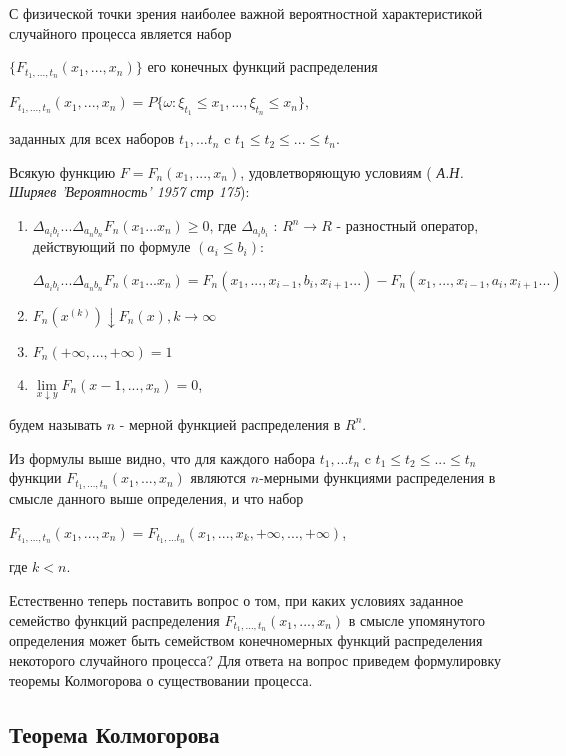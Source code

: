 С физической точки зрения наиболее важной вероятностной характеристикой случайного процесса является набор 

$\lbrace F_{t_{1}, ..., t_{n}}(x_1, ..., x_n) \rbrace$ его конечных функций распределения
\begin{center}
 $ F_{t_{1}, ..., t_{n}}(x_1, ..., x_n) = P \lbrace \omega : \xi_{t_1} \leq x_1, ..., \xi_{t_n} \leq x_n \rbrace$,
\end{center}
заданных для всех наборов $t_1, ... t_n$ c $t_1 \le t_2 \le ... \le t_n$.

Всякую функцию $F = F_n (x_1, ..., x_n)$, удовлетворяющую условиям ( \textit{А.Н. Ширяев 'Вероятность' 1957 стр 175}):
\begin{enumerate}
\item $	\Delta_{a_i b_i}...\Delta_{a_n b_n} F_n (x_1... x_n) \geq 0$, где $	\Delta_{a_i b_i}$ : $R^n \rightarrow R$ - разностный оператор, действующий по формуле $(a_i \leq b_i)$:
\begin{center}
$\Delta_{a_i b_i}...\Delta_{a_n b_n} F_n (x_1... x_n) = F_n(x_1, ..., x_{i-1}, b_i, x_{i+1} ...) - F_n(x_1, ..., x_{i-1}, a_i, x_{i+1} ...) $
\end{center}
\item $F_n(x^{(k)}) \downarrow F_n(x), k  \rightarrow \infty$
\item $F_n(+\infty , ..., +\infty) = 1$
\item $\lim\limits_{x \downarrow y} F_n(x-1, ..., x_n) = 0$,
\end{enumerate}
будем называть $n$ - мерной функцией распределения в $R^n$.

Из формулы выше видно, что для каждого набора $t_1, ... t_n$ c $t_1 \le t_2 \le ... \le t_n$ функции $F_{t_{1}, ..., t_{n}}(x_1, ..., x_n)$ являются $n$-мерными функциями распределения в смысле данного выше определения, и что набор 
\begin{center}
 $ F_{t_{1}, ..., t_{n}}(x_1, ..., x_n) = F_{{t_1}, ... {t_n}} (x_1 , ..., x_k, +\infty , ..., +\infty)$, 
\end{center}
где $k < n$.

Естественно теперь поставить вопрос о том, при каких условиях заданное семейство функций распределения $F_{t_{1}, ..., t_{n}}(x_1, ..., x_n)$ в смысле упомянутого определения может быть семейством конечномерных функций распределения некоторого случайного процесса? Для ответа на вопрос приведем формулировку теоремы Колмогорова о существовании процесса. 

\subsection{Теорема Колмогорова}

